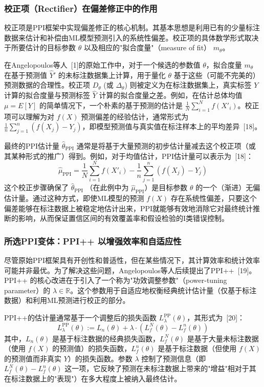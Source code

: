 \documentclass[12pt,a4paper]{article}
\begin{document}
\subsubsection{校正项（Rectifier）在偏差修正中的作用}
\label{sec:rectifier}
校正项是PPI框架中实现偏差修正的核心机制。其基本思想是利用已有的少量标注数据来估计和补偿由ML模型预测引入的系统性偏差。校正项的具体数学形式取决于所要估计的目标参数 $\theta$ 以及相应的"拟合度量"（measure of fit） $m_{\theta}$。

在Angelopoulos等人~{[1]}的原始工作中，对于一个候选的参数值 $\theta$，拟合度量 $m_{\theta}$ 在基于预测值 $\hat{Y}'$ 的未标注数据集上计算，用于量化 $\theta$ 基于这些（可能不完美的）预测数据的合理性。校正项 $D_{\theta}$ (或 $\Delta_{\theta}$) 则被定义为在标注数据集上，真实标签 $Y$ 计算的拟合度量与预测标签 $\hat{Y}$ 计算的拟合度量之差。例如，在估计总体均值 $\mu=E[Y]$ 的简单情况下，一个朴素的基于预测的估计是 $\frac{1}{N}\sum_{i=1}^{N}f(X'_i)$。校正项可以理解为对 $f(X)$ 预测偏差的经验估计，通常形式为 $\frac{1}{n}\sum_{j=1}^{n}(f(X_j)-Y_j)$，即模型预测值与真实值在标注样本上的平均差异~{[18]}。

最终的PPI估计量 $\hat{\theta}_{\text{PPI}}$ 通常是将基于大量预测的初步估计量减去这个校正项（或其某种形式的推广）得到。例如，对于均值估计，PPI估计量可以表示为~{[18]}：
\begin{equation}
\hat{\mu}_{\text{PPI}} = \frac{1}{N} \sum_{i=1}^{N} f(X'_i) - \frac{1}{n} \sum_{j=1}^{n} (f(X_j) - Y_j)
\label{eq:ppi_estimator_new}
\end{equation}
这个校正步骤确保了 $\hat{\theta}_{\text{PPI}}$ （在此例中为 $\hat{\mu}_{\text{PPI}}$）是目标参数 $\theta$ 的一个（渐进）无偏估计量。通过这种方式，即使ML模型的预测 $f(X)$ 存在系统性偏差，只要这个偏差能够在标注数据上被稳定地估计出来，PPI就能够有效地消除它对最终统计推断的影响，从而保证置信区间的有效覆盖率和假设检验的I类错误控制。

\subsubsection{所选PPI变体：PPI++ 以增强效率和自适应性}
\label{sec:ppi_plus_plus}
尽管原始PPI框架具有开创性和普适性，但在某些情况下，其计算效率和统计效率可能并非最优。为了解决这些问题，Angelopoulos等人后续提出了PPI++~{[19]}。PPI++ 的核心改进在于引入了一个称为"功效调整参数"（power-tuning parameter）的 $\lambda \in \mathbb{R}$。这个参数用于自适应地权衡经典统计估计量（仅基于标注数据）和利用ML预测进行校正的部分。

PPI++的估计量通常基于一个调整后的损失函数 $L^{\text{PP}}_{\lambda}(\theta)$，其形式为~{[20]}：
\begin{equation}
L^{\text{PP}}_{\lambda}(\theta) := L_n(\theta) + \lambda \cdot (L_f^N(\theta) - L_f^n(\theta))
\label{eq:ppi_plus_plus_loss}
\end{equation}
其中，$L_n(\theta)$ 是基于标注数据的经典损失函数，$L_f^N(\theta)$ 是基于大量未标注数据（使用 $f(X)$ 的预测值）的损失函数，$L_f^n(\theta)$ 是基于标注数据（但使用 $f(X)$ 的预测值而非真实 $Y$）的损失函数。参数 $\lambda$ 控制了预测信息（即 $L_f^N(\theta) - L_f^n(\theta)$ 这一项，它反映了预测在未标注数据上带来的"增益"相对于其在标注数据上的"表现"）在多大程度上被纳入最终估计。
\end{document}
